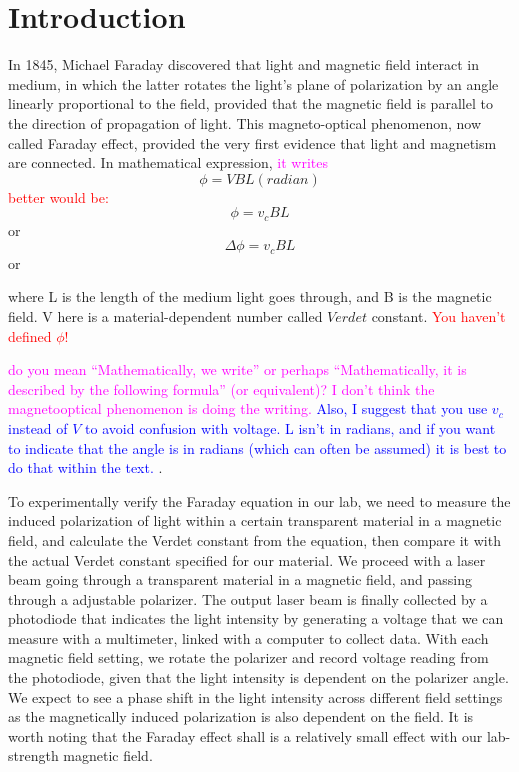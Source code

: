 \documentclass[prb,preprint]{revtex4-1}
\begin{document}
\section{Introduction} 

In 1845, Michael Faraday discovered that light and magnetic field interact in medium, in which the latter rotates the light's plane of polarization by an angle linearly proportional to the field, provided that the magnetic field is parallel to the direction of propagation of light. This magneto-optical phenomenon, now called Faraday effect, provided the very first evidence that light and magnetism are connected. In mathematical expression, \textcolor{magenta}{it writes}
\begin{equation}
\label{faraday}
\phi =VBL  (radian)
\end{equation}
\textcolor{red}{better would be:}
\begin{equation*}
\label{faraday}
\phi =v_cBL 
\end{equation*}
or
\begin{equation*}
\label{faraday}
\Delta\phi =v_cBL 
\end{equation*}
or

where L is the length of the medium light goes through, and B is the magnetic field. V here is a material-dependent number called $Verdet$ constant. 
\textcolor{red}{You haven't defined $\phi$!}

\textcolor{magenta}{do you mean ``Mathematically, we write'' or perhaps ``Mathematically, it is described by the following formula'' (or equivalent)? I don't think the magnetooptical phenomenon is doing the writing.} \textcolor{blue}{Also, I suggest that you use $v_c$ instead of $V$ to avoid confusion with voltage. L isn't in radians, and if you want to indicate that the angle is in radians (which can often be assumed) it is best to do that within the text. }. 

To experimentally verify the Faraday equation in our lab, we need to measure the induced polarization of light within a certain transparent material in a magnetic field, and calculate the Verdet constant from the equation, then compare it with the actual Verdet constant specified for our material. We proceed with a laser beam going through a transparent material in a magnetic field, and passing through a adjustable polarizer. The output laser beam is finally collected by a photodiode that indicates the light intensity by generating a voltage that we can measure with a multimeter, linked with a computer to collect data. With each magnetic field setting, we rotate the polarizer and record voltage reading from the photodiode, given that the light intensity is dependent on the polarizer angle. We expect to see a phase shift in the light intensity across different field settings as the magnetically induced polarization is also dependent on the field. It is worth noting that the Faraday effect shall is a relatively small effect with our lab-strength magnetic field.
\end{document}
